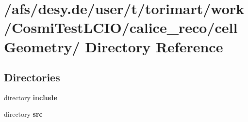 \section{/afs/desy.de/user/t/torimart/work/CosmiTestLCIO/calice\_\-reco/cellGeometry/ Directory Reference}
\label{dir_e433c5ed8c29a1fb48c044a65e2f74b1}
\subsection*{Directories}
\begin{DoxyCompactItemize}
\item 
directory {\bf include}
\item 
directory {\bf src}
\end{DoxyCompactItemize}

